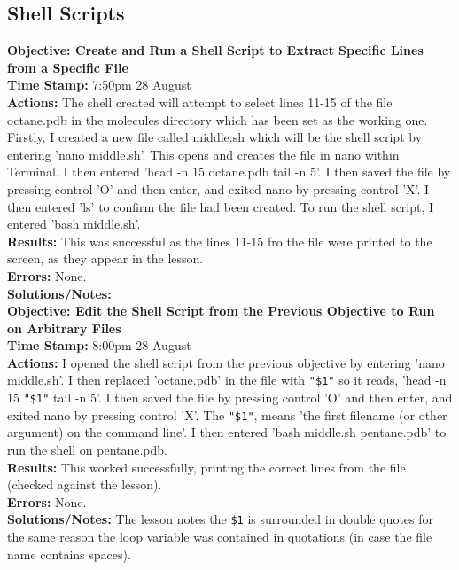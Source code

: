 \documentclass{article}
\begin{document}
\begin{FlushLeft}
\subsection{Shell Scripts}
\textbf{Objective: Create and Run a Shell Script to Extract Specific Lines from a Specific File}\\
\textbf{Time Stamp:} 7:50pm 28 August\\
\textbf{Actions:} The shell created will attempt to select lines 11-15 of the file octane.pdb in the molecules directory which has been set as the working one. Firstly, I created a new file called middle.sh which will be the shell script by entering 'nano middle.sh'. This opens and creates the file in nano within Terminal. I then entered 'head -n 15 octane.pdb \textbar{} tail -n 5'. I then saved the file by pressing control 'O' and then enter, and exited nano by pressing control 'X'. I then entered 'ls' to confirm the file had been created. To run the shell script, I entered 'bash middle.sh'. \\
\textbf{Results:} This was successful as the lines 11-15 fro the file were printed to the screen, as they appear in the lesson. \\
\textbf{Errors:} None.\\
\textbf{Solutions/Notes:}\\
\vspace{5mm}
\textbf{Objective: Edit the Shell Script from the Previous Objective to Run on Arbitrary Files}\\ 
\textbf{Time Stamp:} 8:00pm 28 August\\
\textbf{Actions:} I opened the shell script from the previous objective by entering 'nano middle.sh'. I then replaced 'octane.pdb' in the file with \verb|"$1"| so it reads, 'head -n 15  \verb|"$1"| \textbar{} tail -n 5'. I then saved the file by pressing control 'O' and then enter, and exited nano by pressing control 'X'. The \verb|"$1"|, means 'the first filename (or other argument) on the command line'. I then entered 'bash middle.sh pentane.pdb' to run the shell on pentane.pdb. \\
\textbf{Results:} This worked successfully, printing the correct lines from the file (checked against the lesson).\\
\textbf{Errors:} None.\\
\textbf{Solutions/Notes:} The lesson notes the \verb|$1| is surrounded in double quotes for the same reason the loop variable was contained in quotations (in case the file name contains spaces).\\

\end{FlushLeft}
\end{document}
